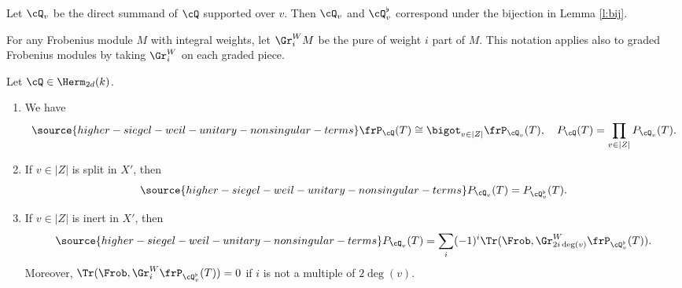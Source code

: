 Let $\cQ_{v}$ be the direct summand of $\cQ$ supported over $v$.  Then $\cQ_{v}$ and $\cQ^{\flat}_{v}$ correspond under the bijection in Lemma \ref{l:bij}.

For any Frobenius module $M$ with integral weights,  let $\Gr^{W}_{i}M$ be the pure of weight $i$ part of $M$. This notation applies also to graded Frobenius modules by taking $\Gr^{W}_{i}$ on each graded piece.

\begin{prop}
\notready\label{l:HSpr factor} Let $\cQ\in \Herm_{2d}(k)$.
\begin{enumerate}
\item We have
\begin{equation}\label{HSpr factor}
\source{higher-siegel-weil-unitary-nonsingular-terms}
\frP_{\cQ}(T)\cong\bigot_{v\in |Z|}\frP_{\cQ_{v}}(T), \quad
P_{\cQ}(T)=\prod_{v\in |Z|}P_{\cQ_{v}}(T).
\end{equation}
\item If $v\in |Z|$ is split in $X'$, then
\begin{equation}\label{PQ split}
\source{higher-siegel-weil-unitary-nonsingular-terms}
P_{\cQ_{v}}(T)=P_{\cQ^{\flat}_{v}}(T).
\end{equation}
\item If $v\in |Z|$ is inert in $X'$, then
\begin{equation}\label{PQ inert}
\source{higher-siegel-weil-unitary-nonsingular-terms}
P_{\cQ_{v}}(T)=\sum_{i}(-1)^{i}\Tr(\Frob,\Gr^{W}_{2i\deg(v)}\frP_{\cQ^{\flat}_{v}}(T)).
\end{equation}
Moreover, $\Tr(\Frob,\Gr^{W}_{i}\frP_{\cQ^{\flat}_{v}}(T))=0$ if $i$ is not a multiple of $2\deg(v)$.
\end{enumerate}
\end{prop}
